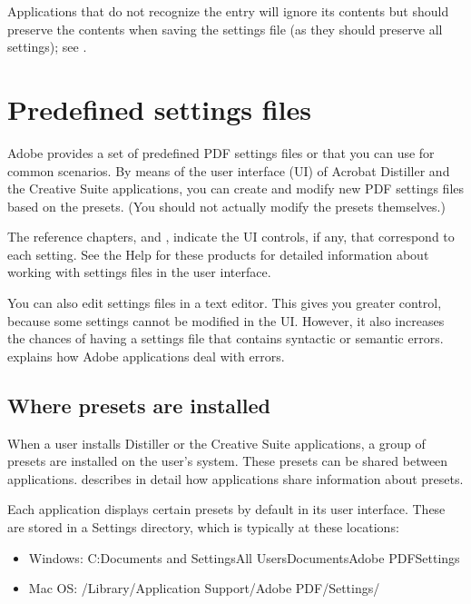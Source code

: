 \documentclass[letterpaper,12pt,english,openany,oneside]{sphinxmanual}
\begin{document}
Applications that do not recognize the  entry will ignore its contents but should preserve the contents when saving the settings file (as they should preserve all settings); see .




\section{Predefined settings files}
\label{\detokenize{index:predefined-settings-files}}
Adobe provides a set of predefined PDF settings files or  that you can use for common scenarios. By means of the user interface (UI) of Acrobat Distiller and the Creative Suite applications, you can create and modify new PDF settings files based on the presets. (You should not actually modify the presets themselves.)

The reference chapters,  and , indicate the UI controls, if any, that correspond to each setting. See the Help for these products for detailed information about working with settings files in the user interface.

You can also edit settings files in a text editor. This gives you greater control, because some settings cannot be modified in the UI. However, it also increases the chances of having a settings file that contains syntactic or semantic errors.  explains how Adobe applications deal with errors.


\subsection{Where presets are installed}
\label{\detokenize{index:where-presets-are-installed}}
When a user installs Distiller or the Creative Suite applications, a group of presets are installed on the user’s system. These presets can be shared between applications.  describes in detail how applications share information about presets.

Each application displays certain presets by default in its user interface. These are stored in a Settings directory, which is typically at these locations:
\begin{itemize}
\item {} 
Windows: C:Documents and SettingsAll UsersDocumentsAdobe PDFSettings

\item {} 
Mac OS: /Library/Application Support/Adobe PDF/Settings/

\end{itemize}
\end{document}
